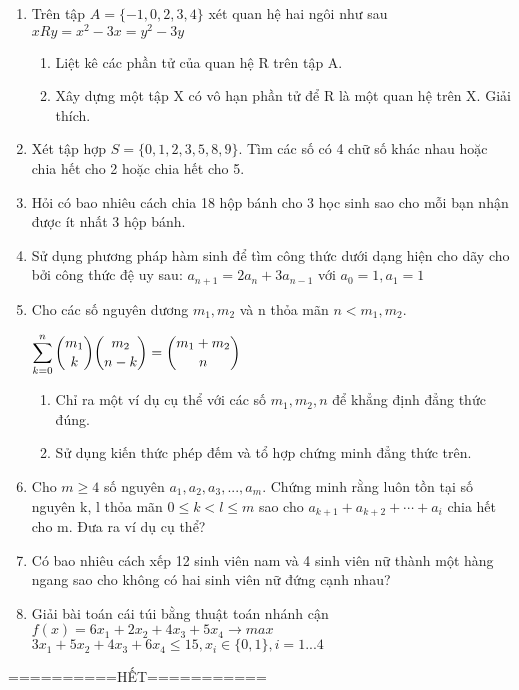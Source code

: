 \documentclass[12pt,oneside]{book}
\begin{document}
\begin{enumerate}[label = {\bf Câu \arabic*.}]
	\item Trên tập $A=\{-1,0,2,3,4\}$ xét quan hệ hai ngôi như sau $x R y = x^2-3x=y^2-3y$
	\begin{enumerate}[label = \alph*)]
		\item Liệt kê các phần tử của quan hệ R trên tập A.
		\item Xây dựng một tập X có vô hạn phần tử để R là một quan hệ trên X. Giải thích.
	\end{enumerate}
	\item Xét tập hợp $S=\{0,1,2,3,5,8,9\}$. Tìm các số có 4 chữ số khác nhau hoặc chia hết cho 2 hoặc chia hết cho 5.
	\item Hỏi có bao nhiêu cách chia 18 hộp bánh cho 3 học sinh sao cho mỗi bạn nhận được ít nhất 3 hộp bánh.
	\item Sử dụng phương pháp hàm sinh để tìm công thức dưới dạng hiện cho dãy cho bởi công thức đệ uy sau: $a_{n+1}=2a_n+3a_{n-1}$ với $a_0=1,a_1=1$
	\item Cho các số nguyên dương $m_1,m_2$ và n thỏa mãn $n<m_1,m_2.$
	\begin{center}
		$\displaystyle \sum_{k=0}^n \dbinom{m_1}{k}\dbinom{m_2}{n-k}=\dbinom{m_1+m_2}{n}$
	\end{center}
	\begin{enumerate}[label = \alph*)]
		\item Chỉ ra một ví dụ cụ thể với các số $m_1,m_2,n$ để khẳng định đẳng thức đúng.
		\item Sử dụng kiến thức phép đếm và tổ hợp chứng minh đẳng thức trên.
	\end{enumerate}
	\item Cho $m \geq 4$ số nguyên $a_1,a_2,a_3,...,a_m.$ Chứng minh rằng luôn tồn tại số nguyên k, l thỏa mãn $0\leq k <l\leq m$ sao cho $a_{k+1}+a_{k+2}+\cdots+a_i$ chia hết cho m. Đưa ra ví dụ cụ thể?
	\item Có bao nhiêu cách xếp 12 sinh viên nam và 4 sinh viên nữ thành một hàng ngang sao cho không có hai sinh viên nữ đứng cạnh nhau?
	\item Giải bài toán cái túi bằng thuật toán nhánh cận\\
	$f(x) = 6x_1+2x_2+4x_3+5x_4\rightarrow max$\\
	$3x_1+5x_2+4x_3+6x_4 \leq 15, x_i \in \{ 0,1\}, i = 1...4$
\end{enumerate}
\begin{center}
	==========HẾT===========
\end{center}
\end{document}
